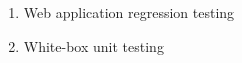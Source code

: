 \begin{enumerate}
    \item Web application regression testing \cite[Tab.~21]{DoğanEtAl2014}
    \item White-box unit testing \citep[pp.~345\==346]{SakamotoEtAl2013}
\end{enumerate}


